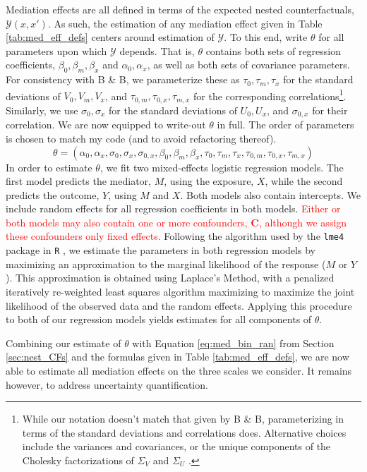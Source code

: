 \documentclass{article}
\newcommand{\sY}{\mathcal{Y}}
\begin{document}
Mediation effects are all defined in terms of the expected nested counterfactuals, $\sY(x, x')$. As such, the estimation of any mediation effect given in Table \ref{tab:med_eff_defs} centers around estimation of $\sY$. To this end, write $\theta$ for all parameters upon which $\sY$ depends. That is, $\theta$ contains both sets of regression coefficients, $\beta_0, \beta_m, \beta_x$ and $\alpha_0, \alpha_x$, as well as both sets of covariance parameters. For consistency with B \& B, we parameterize these as $\tau_0, \tau_m, \tau_x$ for the standard deviations of $V_0, V_m, V_x$, and $\tau_{0,m}, \tau_{0,x}, \tau_{m,x}$ for the corresponding correlations\footnote{While our notation doesn't match that given by B \& B, parameterizing in terms of the standard deviations and correlations does. Alternative choices include the variances and covariances, or the unique components of the Cholesky factorizations of $\Sigma_V$ and $\Sigma_U$ \citep{Wan18}.}. Similarly, we use $\sigma_0, \sigma_x$ for the standard deviations of $U_0, U_x$, and $\sigma_{0,x}$ for their correlation. We are now equipped to write-out $\theta$ in full. The order of parameters is chosen to match my code (and to avoid refactoring thereof).
$$
\theta = (\alpha_0, \alpha_x, \sigma_0, \sigma_x, \sigma_{0,x}, \beta_0, \beta_m, \beta_x, \tau_0, \tau_m, \tau_x, \tau_{0,m}, \tau_{0,x}, \tau_{m,x})
$$
%
In order to estimate $\theta$, we fit two mixed-effects logistic regression models. The first model predicts the mediator, $M$, using the exposure, $X$, while the second predicts the outcome, $Y$, using $M$ and $X$. Both models also contain intercepts. We include random effects for all regression coefficients in both models. \textcolor{red}{Either or both models may also contain one or more confounders, $\mathbf{C}$, although we assign these confounders only fixed effects.} Following the algorithm used by the \texttt{lme4} package in \texttt{R} \citep{Bat15, Wal23}, we estimate the parameters in both regression models by maximizing an approximation to the marginal likelihood of the response ($M$ or $Y$). This approximation is obtained using Laplace's Method, with a penalized iteratively re-weighted least squares algorithm maximizing to maximize the joint likelihood of the observed data and the random effects. Applying this procedure to both of our regression models yields estimates for all components of $\theta$.

Combining our estimate of $\theta$ with Equation \ref{eq:med_bin_ran} from Section \ref{sec:nest_CFs} and the formulas given in Table \ref{tab:med_eff_defs}, we are now able to estimate all mediation effects on the three scales we consider. It remains however, to address uncertainty quantification.
\end{document}

